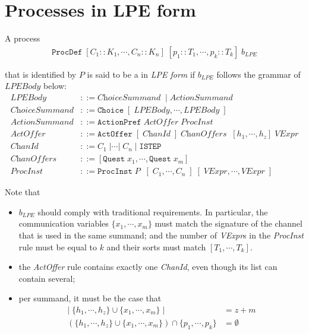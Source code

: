 \section{Processes in LPE form} \label{processlpeform}

A \txs{} process
\begin{align*}
\texttt{ProcDef} \; [C_1 :: K_1, \cdots{}, C_n :: K_n] \; [p_1 :: T_1, \cdots{}, p_k :: T_k] \; b_\textit{LPE}
\end{align*}

that is identified by $P$ is said to be a in \emph{LPE form} if $b_\textit{LPE}$ follows the grammar of $\textit{LPEBody}$ below:
\begin{align*}
\textit{LPEBody} &::= \textit{ChoiceSummand} \; \;|\; \textit{ActionSummand} \\
\textit{ChoiceSummand} &::= \texttt{Choice} \; [ \;\! \textit{LPEBody}, \cdots{}, \textit{LPEBody} \; ] \\
\textit{ActionSummand} &::= \texttt{ActionPref} \; \textit{ActOffer} \; \textit{ProcInst} \\
\textit{ActOffer} &::= \texttt{ActOffer} \; [ \;\! \textit{ChanId} \; ] \; \textit{ChanOffers}\; \; [h_1, \cdots{}, h_z] \; \textit{VExpr} \\
\textit{ChanId} &::= C_1 \;| \cdots{} |\; C_n \;|\; \texttt{ISTEP} \\
\textit{ChanOffers} &::= [\texttt{Quest} \; x_1, \cdots{}, \texttt{Quest} \; x_m] \\
\textit{ProcInst} &::= \texttt{ProcInst} \; P \; \; [ \;\! C_1, \cdots{}, C_n \; ] \; [\;\!\textit{VExpr}, \cdots{}, \textit{VExpr} \; ]
\end{align*}

Note that
\begin{itemize}
\item $b_\textit{LPE}$ should comply with traditional \txs{} requirements.
In particular, the communication variables $\{ x_1, \cdots{}, x_m \}$ must match the signature of the channel that is used in the same summand; and the number of \textit{VExpr}s in the \textit{ProcInst} rule must be equal to $k$ and their sorts must match $[T_1, \cdots{}, T_k]$.
\item the \textit{ActOffer} rule contains exactly one \textit{ChanId}, even though its list can contain several;
\item per summand, it must be the case that
\begin{align*}
|\; \{ h_1, \cdots{}, h_z \} \cup \{ x_1, \cdots{}, x_m \} \; | &= z + m \\
(\{ h_1, \cdots{}, h_z \} \cup \{ x_1, \cdots{}, x_m \}) \cap \{ p_1, \cdots{}, p_k \} &= \emptyset{}
\end{align*}
\end{itemize}

